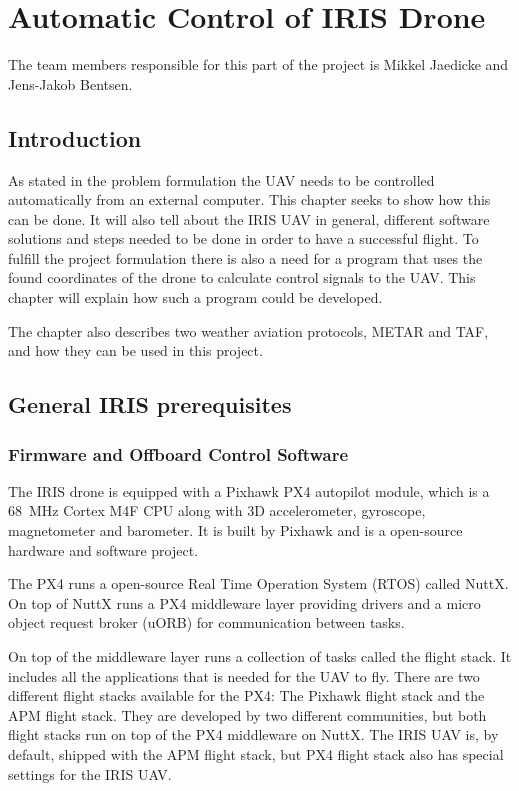 \section{Automatic Control of IRIS Drone}
The team members responsible for this part of the project is Mikkel Jaedicke and Jens-Jakob Bentsen.
\subsection{Introduction}
As stated in the problem formulation the UAV needs to be controlled automatically from an external computer. This chapter seeks to show how this can be done. It will also tell about the IRIS UAV in general, different software solutions and steps needed to be done in order to have a successful flight. To fulfill the project formulation there is also a need for a program that uses the found coordinates of the drone to calculate control signals to the UAV. This chapter will explain how such a program could be developed. 

The chapter also describes two weather aviation protocols, METAR and TAF, and how they can be used in this project.

\subsection{General IRIS prerequisites}
\subsubsection{Firmware and Offboard Control Software}
The IRIS drone is equipped with a Pixhawk PX4 autopilot module, which is a \SI{68}{\mega\hertz} Cortex M4F CPU along with 3D accelerometer, gyroscope, magnetometer and barometer. It is built by Pixhawk and is a open-source hardware and software project.

The PX4 runs a open-source Real Time Operation System (RTOS) called NuttX. On top of NuttX runs a PX4 middleware layer providing drivers and a micro object request broker (uORB) for communication between tasks.

On top of the middleware layer runs a collection of tasks called the flight stack. It includes all the applications that is needed for the UAV to fly. There are two different flight stacks available for the PX4: The Pixhawk flight stack and the APM flight stack. They are developed by two different communities, but both flight stacks run on top of the PX4 middleware on NuttX. The IRIS UAV is, by default, shipped with the APM flight stack, but PX4 flight stack also has special settings for the IRIS UAV. 

